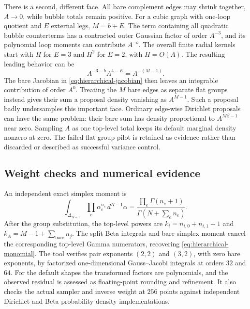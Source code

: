 There is a second, different face.  All bare complement edges may shrink
together, $A\to0$, while bubble totals remain positive.  For a cubic graph
with one-loop quotient and $E$ external legs, $M=b+E$.  The term containing
all quadratic bubble counterterms has a contracted outer Gaussian factor
of order $A^{-3}$, and its polynomial loop moments can contribute
$A^{-b}$.  The overall finite radial kernels start with $H$ for $E=3$
and $H^2$ for $E=2$, with $H=O(A)$.  The resulting leading behavior can be
\[
 A^{-3-b}A^{4-E}=A^{-(M-1)}.
\]
The bare Jacobian in \eqref{eq:hierarchical-jacobian} then leaves an
integrable contribution of order $A^0$.  Treating the $M$ bare edges as
separate flat groups instead gives their sum a proposal density vanishing
as $A^{M-1}$.  Such a proposal badly undersamples this important face.
Ordinary edge-wise Dirichlet proposals can have the same problem: their
bare sum has density proportional to $A^{M\beta-1}$ near zero.  Sampling
$A$ as one top-level total keeps its default marginal density nonzero at
zero.  The failed flat-group pilot is retained as evidence rather than
discarded or described as successful variance control.

\subsection{Weight checks and numerical evidence}

An independent exact simplex moment is
\begin{equation}
 \int_{\Delta_{N-1}}\prod_e\alpha_e^{n_e}\,d^{N-1}\alpha
 =\frac{\prod_e\Gamma(n_e+1)}{\Gamma(N+\sum_e n_e)}.
 \label{eq:hierarchical-monomial}
\end{equation}
After the group substitution, the top-level powers are
$k_i=n_{i,0}+n_{i,1}+1$ and
$k_A=M-1+\sum_{\mathrm{bare}}n_j$.  The split Beta integrals and bare
simplex moment cancel the corresponding top-level Gamma numerators,
recovering \eqref{eq:hierarchical-monomial}.  The tool verifies pair
exponents $(2,2)$ and $(3,2)$, with zero bare exponents, by factorized
one-dimensional Gauss--Jacobi integrals at orders $32$ and $64$.  For the
default shapes the transformed factors are polynomials, and the observed
residual is assessed as floating-point rounding and refinement.  It also
checks the actual sampler and inverse weight at $256$ points against
independent Dirichlet and Beta probability-density implementations.

